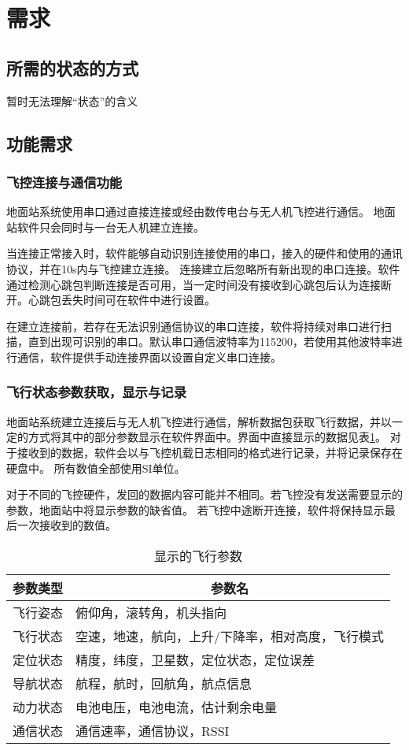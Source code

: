 \section{需求}
\subsection{所需的状态的方式}
暂时无法理解“状态”的含义

\subsection{功能需求}
\subsubsection{飞控连接与通信功能}
地面站系统使用串口通过直接连接或经由数传电台与无人机飞控进行通信。
地面站软件只会同时与一台无人机建立连接。

当连接正常接入时，软件能够自动识别连接使用的串口，接入的硬件和使用的通讯协议，并在10s内与飞控建立连接。
连接建立后忽略所有新出现的串口连接。软件通过检测心跳包判断连接是否可用，当一定时间没有接收到心跳包后认为连接断开。心跳包丢失时间可在软件中进行设置。

在建立连接前，若存在无法识别通信协议的串口连接，软件将持续对串口进行扫描，直到出现可识别的串口。默认串口通信波特率为115200，若使用其他波特率进行通信，软件提供手动连接界面以设置自定义串口连接。

\subsubsection{飞行状态参数获取，显示与记录}
地面站系统建立连接后与无人机飞控进行通信，解析数据包获取飞行数据，并以一定的方式将其中的部分参数显示在软件界面中。界面中直接显示的数据见表\ref{t3dppara}。
对于接收到的数据，软件会以与飞控机载日志相同的格式进行记录，并将记录保存在硬盘中。
所有数值全部使用SI单位。

对于不同的飞控硬件，发回的数据内容可能并不相同。若飞控没有发送需要显示的参数，地面站中将显示参数的缺省值。
若飞控中途断开连接，软件将保持显示最后一次接收到的数值。

\begin{table}[ht]
\centering
\caption{显示的飞行参数}
\label{t3dppara}
\begin{tabular}{|l|l|}
\hline
\multicolumn{1}{|c|}{参数类型} & \multicolumn{1}{c|}{参数名}  \\ \hline
飞行姿态 & 俯仰角，滚转角，机头指向              \\ \hline
飞行状态 & 空速，地速，航向，上升/下降率，相对高度，飞行模式 \\ \hline
定位状态 & 精度，纬度，卫星数，定位状态，定位误差       \\ \hline
导航状态 & 航程，航时，回航角，航点信息            \\ \hline
动力状态 & 电池电压，电池电流，估计剩余电量          \\ \hline
通信状态 & 通信速率，通信协议，RSSI            \\ \hline
\end{tabular}
\end{table}

